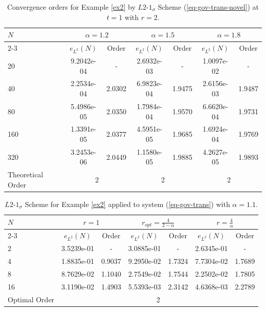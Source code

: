 \documentclass[11pt]{article}
\numberwithin{equation}{section}
\begin{document}
\begin{table}[!ht]
\caption{Convergence orders for Example \ref{ex2} by $L2$-$1_\sigma$ Scheme (\ref{eq-gov-trans-novel}) at $t=1$ with $r=2$.}
\renewcommand{\arraystretch}{1}
\def\temptablewidth{0.95\textwidth}
\begin{center}
 \begin{tabular*}{\temptablewidth}{@{\extracolsep{\fill}}lcccccc}\hline
 $N$  &\multicolumn{2}{c}{$\alpha=1.2$} &\multicolumn{2}{c}{$\alpha=1.5$} &\multicolumn{2}{c}{$\alpha=1.8$}\\
 \cline{2-3}\cline{4-5}\cline{6-7}
 & $e_{L^{2}}(N)$         &Order     &$e_{L^{2}}(N)$    &Order    &$e_{L^{2}}(N)$ &Order     \\ \hline 
 20  &9.2042e-04   &-       &2.6932e-03   &-        &1.0097e-02  &-  \\
 40  &2.2534e-04   &2.0302  &6.9823e-04   &1.9475   &2.6156e-03  &1.9487    \\
 80  &5.4986e-05   &2.0350  &1.7984e-04   &1.9570   &6.6620e-04  &1.9731 \\
 160 &1.3391e-05   &2.0377  &4.5951e-05   &1.9685   &1.6924e-04  &1.9769    \\
 320 &3.2453e-06   &2.0449  &1.1580e-05   &1.9885   &4.2627e-05  &1.9893  \\\hline
 Theoretical Order
 &\multicolumn{2}{c}{2} &\multicolumn{2}{c}{2}&\multicolumn{2}{c}{2}\\ \hline
\end{tabular*}
\end{center}
\end{table}
\fi

\iffalse

\begin{table}[!ht]
\caption{$L2$-$1_\sigma$ Scheme for Example \ref{ex2} applied to system (\ref{eq-gov-trans}) with $\alpha=1.1$.}
\renewcommand{\arraystretch}{1}
\def\temptablewidth{0.95\textwidth}
\begin{center}
 \begin{tabular*}{\temptablewidth}{@{\extracolsep{\fill}}lcccccc}\hline
 $N$ &\multicolumn{2}{c}{$r=1$} &\multicolumn{2}{c}{$r_{opt}=\frac{4}{2-\alpha}$} &\multicolumn{2}{c}{$r=\frac{4}{\alpha}$}    \\
 \cline{2-3}\cline{4-5}\cline{6-7}
 & $e_{L^{2}}(N)$         &Order     &$e_{L^{2}}(N)$    &Order    &$e_{L^{2}}(N)$ &Order     \\ \hline 
 2 &3.5239e-01     &-       &3.0885e-01   &-        &2.6345e-01  &-  \\
 4 &1.8835e-01     &0.9037  &9.2950e-02   &1.7324   &7.7304e-02  &1.7689    \\
 8 &8.7629e-02     &1.1040  &2.7549e-02   &1.7544   &2.2502e-02  &1.7805 \\
 16 &3.1190e-02    &1.4903  &5.5393e-03   &2.3142   &4.6368e-03  &2.2789    \\\hline
 Optimal Order  &\multicolumn{6}{c}{2} \\ \hline
\end{tabular*}
\end{center}
\end{table}
\end{document}
